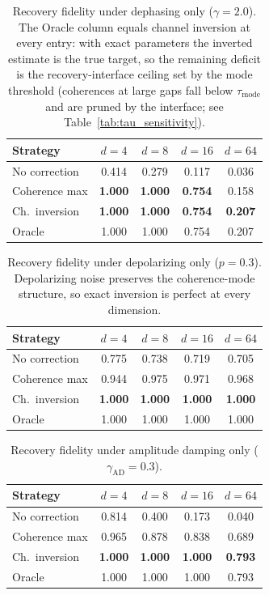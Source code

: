 \documentclass[12pt,a4paper]{article}
\begin{document}
\begin{table}[!tb]
\caption{Recovery fidelity under dephasing only ($\gamma = 2.0$).
The Oracle column equals channel inversion at every entry: with exact parameters the inverted estimate is the true target, so the remaining deficit is the recovery-interface ceiling set by the mode threshold (coherences at large gaps fall below $\tau_\mathrm{mode}$ and are pruned by the interface; see Table~\ref{tab:tau_sensitivity}).}
\label{tab:dephasing_only}

\begin{tabular}{lcccc}
Strategy & $d{=}4$ & $d{=}8$ & $d{=}16$ & $d{=}64$ \\
\hline
No correction   & 0.414 & 0.279 & 0.117 & 0.036 \\
Coherence max   & \textbf{1.000} & \textbf{1.000} & \textbf{0.754} & 0.158 \\
Ch.\ inversion  & \textbf{1.000} & \textbf{1.000} & \textbf{0.754} & \textbf{0.207} \\
Oracle          & 1.000 & 1.000 & 0.754 & 0.207 \\
\end{tabular}

\end{table}

\begin{table}[!tb]
\caption{Recovery fidelity under depolarizing only ($p = 0.3$).
Depolarizing noise preserves the coherence-mode structure, so exact inversion is perfect at every dimension.}
\label{tab:depol_only}

\begin{tabular}{lcccc}
Strategy & $d{=}4$ & $d{=}8$ & $d{=}16$ & $d{=}64$ \\
\hline
No correction   & 0.775 & 0.738 & 0.719 & 0.705 \\
Coherence max   & 0.944 & 0.975 & 0.971 & 0.968 \\
Ch.\ inversion  & \textbf{1.000} & \textbf{1.000} & \textbf{1.000} & \textbf{1.000} \\
Oracle          & 1.000 & 1.000 & 1.000 & 1.000 \\
\end{tabular}

\end{table}

\begin{table}[!tb]
\caption{Recovery fidelity under amplitude damping only ($\gamma_\mathrm{AD} = 0.3$).}
\label{tab:ampdamp_only}

\begin{tabular}{lcccc}
Strategy & $d{=}4$ & $d{=}8$ & $d{=}16$ & $d{=}64$ \\
\hline
No correction   & 0.814 & 0.400 & 0.173 & 0.040 \\
Coherence max   & 0.965 & 0.878 & 0.838 & 0.689 \\
Ch.\ inversion  & \textbf{1.000} & \textbf{1.000} & \textbf{1.000} & \textbf{0.793} \\
Oracle          & 1.000 & 1.000 & 1.000 & 0.793 \\
\end{tabular}

\end{table}
\end{document}
